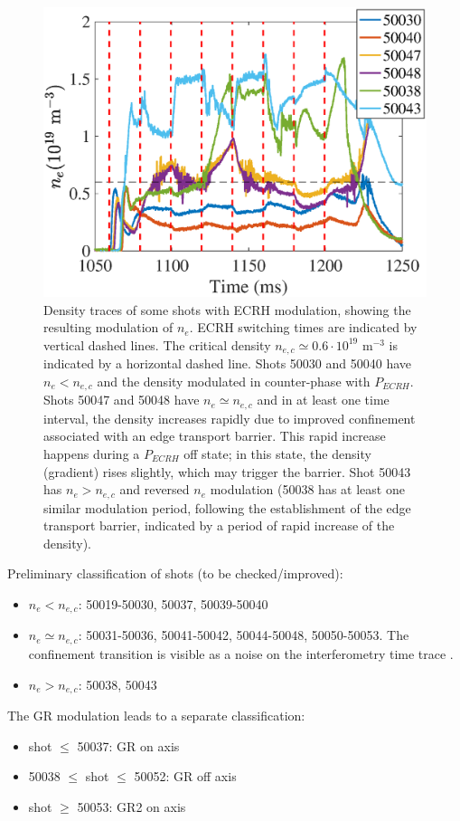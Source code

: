\documentclass[preprint,12pt,authoryear]{elsarticle}
\begin{document}
\begin{figure}[!ht]
\centering
   \includegraphics[width=0.75\columnwidth]{Images/Densities.eps}
   \caption{Density traces of some shots with ECRH modulation, showing the resulting modulation of $n_e$. ECRH switching times are indicated by vertical dashed lines. The critical density $n_{e,c} \simeq 0.6 \cdot 10^{19}$ m$^{-3}$ is indicated by a horizontal dashed line. Shots 50030 and 50040 have $n_e < n_{e,c}$ and the density modulated in counter-phase with $P_{ECRH}$. Shots 50047 and 50048 have $n_e \simeq n_{e,c}$ and in at least one time interval, the density increases rapidly due to improved confinement associated with an edge transport barrier. This rapid increase happens during a $P_{ECRH}$ off state; in this state, the density (gradient) rises slightly, which may trigger the barrier. Shot 50043 has $n_e > n_{e,c}$ and reversed $n_e$ modulation (50038 has at least one similar modulation period, following the establishment of the edge transport barrier, indicated by a period of rapid increase of the density).}
   \label{Fig:Densities_1}
\end{figure}

Preliminary classification of shots (to be checked/improved):
\begin{itemize}
\item $n_e < n_{e,c}$: 50019-50030, 50037, 50039-50040
\item $n_e \simeq n_{e,c}$: 50031-50036, 50041-50042, 50044-50048, 50050-50053. The confinement transition is visible as a noise on the interferometry time trace \cite{Milligen:2011}.
\item $n_e > n_{e,c}$: 50038, 50043
\end{itemize}

The GR modulation leads to a separate classification:
\begin{itemize}
\item shot $\le$ 50037: GR on axis
\item 50038 $\le$ shot $\le$ 50052: GR off axis
\item shot $\ge$ 50053: GR2 on axis
\end{itemize}
\end{document}
